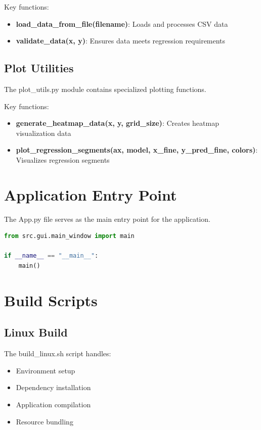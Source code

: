 \documentclass[12pt,a4paper]{report}
\begin{document}
Key functions:
\begin{itemize}
    \item \textbf{load\_data\_from\_file(filename)}: Loads and processes CSV data
    \item \textbf{validate\_data(x, y)}: Ensures data meets regression requirements
\end{itemize}

\section{Plot Utilities}
The plot\_utils.py module contains specialized plotting functions.

Key functions:
\begin{itemize}
    \item \textbf{generate\_heatmap\_data(x, y, grid\_size)}: Creates heatmap visualization data
    \item \textbf{plot\_regression\_segments(ax, model, x\_fine, y\_pred\_fine, colors)}: Visualizes regression segments
\end{itemize}

\chapter{Application Entry Point}
The App.py file serves as the main entry point for the application.

\begin{tcolorbox}[title=Application Initialization]
\begin{lstlisting}[language=Python]
from src.gui.main_window import main

if __name__ == "__main__":
    main()
\end{lstlisting}
\end{tcolorbox}

\chapter{Build Scripts}
\section{Linux Build}
The build\_linux.sh script handles:
\begin{itemize}
    \item Environment setup
    \item Dependency installation
    \item Application compilation
    \item Resource bundling
\end{itemize}
\end{document}
